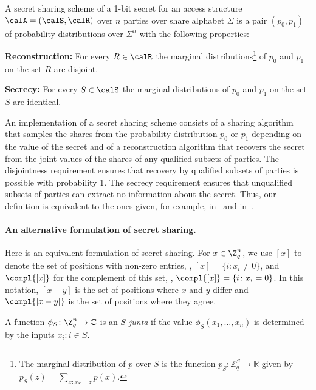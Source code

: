\documentclass{toc}
\begin{document}
\begin{definition}\label{def:SecretSharing}
A secret sharing scheme of a 1-bit secret for an 
%
%
access structure
$\calA=(\calS,\calR)$ over $n$ parties over share alphabet $\Sigma$ is
%
a pair $(p_0,p_1)$ of probability distributions %
over $\Sigma^n$ with the following properties:
\begin{description}
\item {\bf Reconstruction:} \label{def:ss_correctness} For every $R \in \calR$
the marginal distributions\footnote{The marginal distribution of $p$ over $S$ is the function $p_S\colon \mathbb{Z}_q^S \to \mathbb{R}$ given by $p_S(z) = \sum_{x\colon x_S = z} p(x)$.} 
%
%
of $p_0$ and $p_1$ on the set $R$ are disjoint.
\item {\bf Secrecy:} \label{def:ss_secrecy} For every $S \in \calS$ the marginal
distributions of $p_0$ and $p_1$ on the set $S$ are identical.
\end{description}
\end{definition}

An implementation of a secret sharing scheme consists of a sharing algorithm
that samples the shares from the probability distribution $p_0$ or $p_1$ depending on the value
of the secret and of a reconstruction algorithm that recovers the secret from
the joint values of the shares of any qualified subsets of parties. The disjointness requirement ensures that recovery by qualified subsets of parties is possible with probability 1.  The
secrecy requirement ensures that unqualified subsets of parties can extract no
information about the secret. Thus, our definition is equivalent to the ones
given, for example, in~\cite[Definition 3.6]{BeimelPHD} and in~\cite[Definitions
2 and 3]{Beimel11}.

\paragraph{An alternative formulation of secret sharing.}
Here is an equivalent formulation of secret sharing.  For $x \in \Z_q^n$,
we use $[x]$ to denote the set of positions with non-zero entries,
\ie, $[x] = \{i\colon x_i \neq 0\}$, and $\compl{[x]}$ for
the complement of this set, \ie, $\compl{[x]}=\{i\colon x_i = 0\}$.  
In this notation, $[x - y]$ is the set of positions
where  $x$ and $y$ differ and $\compl{[x - y]}$ is the set of positions
where they agree.

A function $\phi_S \colon \Z_q^n \to \mathbb{C}$ is an \emph{$S$-junta} if the value $\phi_S(x_1, \dots, x_n)$ is determined by the inputs $x_i\colon i \in S$.
\end{document}
